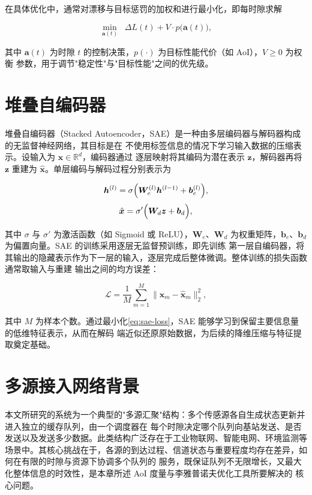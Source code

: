 在具体优化中，通常对漂移与目标惩罚的加权和进行最小化，即每时隙求解

\begin{equation}\label{eq:drift-penalty}
  \min_{\boldsymbol{a}(t)}\;\; \Delta L(t) + V\cdot p\bigl(\boldsymbol{a}(t)\bigr),
\end{equation}

其中 $\boldsymbol{a}(t)$ 为时隙 $t$ 的控制决策，$p(\cdot)$ 为目标性能代价（如 AoI），$V\ge 0$ 为权衡
参数，用于调节"稳定性"与"目标性能"之间的优先级。

\section{堆叠自编码器}

堆叠自编码器（Stacked Autoencoder，SAE）是一种由多层编码器与解码器构成的无监督神经网络，其目标是在
不使用标签信息的情况下学习输入数据的压缩表示。设输入为 $\boldsymbol{x}\in\mathbb{R}^{d}$，编码器通过
逐层映射将其编码为潜在表示 $\boldsymbol{z}$，解码器再将 $\boldsymbol{z}$ 重建为
$\hat{\boldsymbol{x}}$。单层编码与解码过程分别表示为

\begin{equation}\label{eq:encoder}
  \boldsymbol{h}^{(l)} = \sigma\Bigl(\boldsymbol{W}_{e}^{(l)}\boldsymbol{h}^{(l-1)}
  +\boldsymbol{b}_{e}^{(l)}\Bigr),
\end{equation}
\begin{equation}\label{eq:decoder}
  \hat{\boldsymbol{x}} = \sigma'\Bigl(\boldsymbol{W}_{d}\boldsymbol{z}
  +\boldsymbol{b}_{d}\Bigr),
\end{equation}

其中 $\sigma$ 与 $\sigma'$ 为激活函数（如 Sigmoid 或 ReLU），$\boldsymbol{W}_{e}$、$\boldsymbol{W}_{d}$
为权重矩阵，$\boldsymbol{b}_{e}$、$\boldsymbol{b}_{d}$ 为偏置向量。SAE 的训练采用逐层无监督预训练，即先训练
第一层自编码器，将其输出的隐藏表示作为下一层的输入，逐层完成后整体微调。整体训练的损失函数通常取输入与重建
输出之间的均方误差：

\begin{equation}\label{eq:sae-loss}
  \mathcal{L} = \frac{1}{M}\sum_{m=1}^{M}\bigl\|
  \boldsymbol{x}_{m} - \hat{\boldsymbol{x}}_{m}\bigr\|_{2}^{2},
\end{equation}

其中 $M$ 为样本个数。通过最小化\cref{eq:sae-loss}，SAE 能够学习到保留主要信息量的低维特征表示，从而在解码
端近似还原原始数据，为后续的降维压缩与特征提取奠定基础。

\section{多源接入网络背景}

本文所研究的系统为一个典型的"多源汇聚"结构：多个传感源各自生成状态更新并进入独立的缓存队列，由一个调度器在
每个时隙决定哪个队列向基站发送、是否发送以及发送多少数据。此类结构广泛存在于工业物联网、智能电网、环境监测等
场景中。其核心挑战在于，各源的到达过程、信道状态与重要程度均存在差异，如何在有限的时隙与资源下协调多个队列的
服务，既保证队列不无限增长，又最大化整体信息的时效性，是本章所述 AoI 度量与李雅普诺夫优化工具所要解决的
核心问题。
